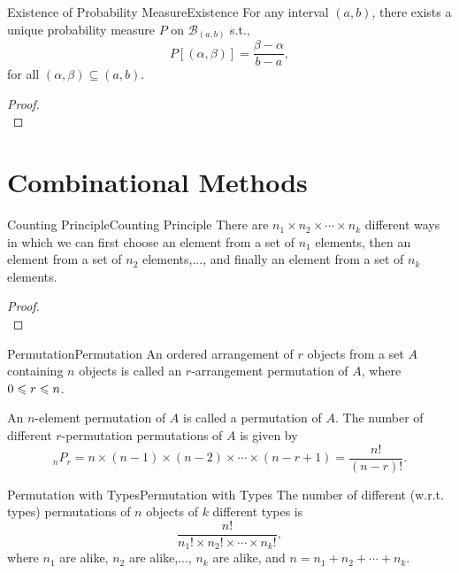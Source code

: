 \documentclass{elegantbook}
\begin{document}
\begin{theorem}{Existence of Probability Measure}{Existence}
For any interval $(a,b)$, there exists a unique probability measure $P$ on $\mathcal{B}_{(a,b)}$ s.t., $$P\left[(\alpha,\beta)\right]=\frac{\beta-\alpha}{b-a},$$
for all $(\alpha,\beta)\subseteq(a,b)$.
\end{theorem}

\begin{proof}
\\[4cm]\vspace{0.01cm}
\end{proof}

\chapter{Combinational Methods}

\begin{theorem}{Counting Principle}{Counting Principle}
There are $n_1\times n_2\times\cdots\times n_k$ dif\/ferent ways in which we can f\/irst choose an element from a set of $n_1$  elements, then an element from a set of $n_2$ elements,..., and f\/inally an element from a set of $n_k$ elements.
\end{theorem}

\begin{proof}
\\[2cm]\vspace{0.01cm}
\end{proof}

\begin{definition}{Permutation}{Permutation}
An ordered arrangement of $r$ objects from a set $A$ containing $n$ objects is called an $r$-arrangement permutation of $A$, where $0\leqslant r\leqslant n$. 

An $n$-element permutation of $A$ is called a permutation of $A$. The number of dif\/ferent $r$-permutation permutations of $A$ is given by $$_nP_r =n\times(n-1)\times(n-2)\times\cdots\times(n-r+1)=\frac{n!}{(n-r)!}.$$
\end{definition}

\begin{theorem}{Permutation with Types}{Permutation with Types}
The number of dif\/ferent (w.r.t. types) permutations of $n$ objects of $k$ dif\/ferent types is $$\frac{n!}{n_1 !\times n_2 !\times\cdots\times n_k !},$$
where $n_1$  are alike, $n_2$  are alike,..., $n_k$  are alike, and $n=n_1+n_2+\cdots+n_k $.
\end{theorem}
\end{document}
